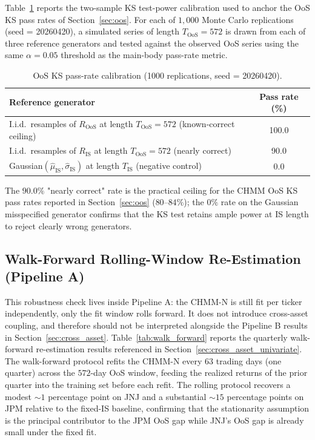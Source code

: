 Table~\ref{tab:ks_power} reports the two-sample KS test-power calibration used to anchor the OoS KS pass rates of Section~\ref{sec:oos}.
For each of $1{,}000$ Monte Carlo replications (seed = 20260420), a simulated series of length $T_{\text{OoS}} = 572$ is drawn from each of three reference generators and tested against the observed OoS series using the same $\alpha = 0.05$ threshold as the main-body pass-rate metric.

\begin{table}[h]
\centering
\small
\caption{OoS KS pass-rate calibration (1000 replications, seed = 20260420).}
\label{tab:ks_power}
\begin{tabular}{l c}
\toprule
Reference generator & Pass rate (\%) \\
\midrule
I.i.d.\ resamples of $R_{\text{OoS}}$ at length $T_{\text{OoS}} = 572$ (known-correct ceiling) & 100.0 \\
I.i.d.\ resamples of $R_{\text{IS}}$ at length $T_{\text{OoS}} = 572$ (nearly correct)          & 90.0  \\
Gaussian$(\hat\mu_{\text{IS}}, \hat\sigma_{\text{IS}})$ at length $T_{\text{IS}}$ (negative control) & 0.0 \\
\bottomrule
\end{tabular}
\end{table}

The $90.0\%$ "nearly correct" rate is the practical ceiling for the CHMM OoS KS pass rates reported in Section~\ref{sec:oos} ($80$--$84\%$); the $0\%$ rate on the Gaussian misspecified generator confirms that the KS test retains ample power at IS length to reject clearly wrong generators.

\subsection{Walk-Forward Rolling-Window Re-Estimation (Pipeline A)}
\label{sec:walk_forward}

This robustness check lives inside Pipeline A: the CHMM-N is still fit per ticker independently, only the fit window rolls forward. It does not introduce cross-asset coupling, and therefore should not be interpreted alongside the Pipeline B results in Section~\ref{sec:cross_asset}. Table~\ref{tab:walk_forward} reports the quarterly walk-forward re-estimation results referenced in Section~\ref{sec:cross_asset_univariate}.
The walk-forward protocol refits the CHMM-N every $63$ trading days (one quarter) across the $572$-day OoS window, feeding the realized returns of the prior quarter into the training set before each refit.
The rolling protocol recovers a modest $\sim 1$ percentage point on JNJ and a substantial $\sim 15$ percentage points on JPM relative to the fixed-IS baseline, confirming that the stationarity assumption is the principal contributor to the JPM OoS gap while JNJ's OoS gap is already small under the fixed fit.

